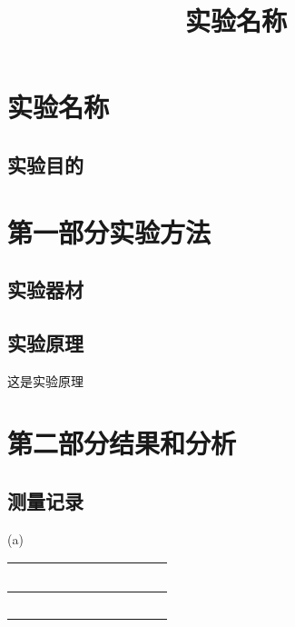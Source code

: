 \documentclass[12pt]{ctexart}
\title{实验名称}
\begin{document}
\section*{实验名称}
\subsection*{实验目的} 

\section*{\Large 第一部分\quad 实验方法}
\subsection*{实验器材} 


\subsection*{实验原理}
   这是实验原理


\section*{\Large 第二部分\quad 结果和分析}
\subsection*{测量记录}
\begin{table}[H]
   \centering
   {\large(a)}\vspace{0.2cm}\\
   \begin{tabular}{|c|c|c|c|c|c|c|}
   \hline
      ~ & ~ & ~ & ~ & ~ & ~ & ~ \\ \hline
      ~ & ~ & ~ & ~ & ~ & ~ & ~ \\ \hline
   \end{tabular}\vspace{0.2cm}
\end{table}
\end{document}
